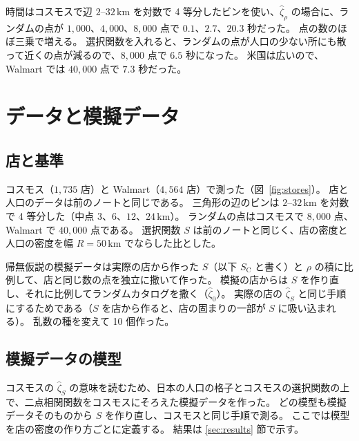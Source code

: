 \documentclass[a4paper,11pt]{ltjsarticle}
\begin{document}
時間はコスモスで辺 $2$--$32\,\mathrm{km}$ を対数で 4 等分したビンを使い、$\hat\zeta_\rho$ の場合に、ランダムの点が $1{,}000$、$4{,}000$、$8{,}000$ 点で $0.1$、$2.7$、$20.3$ 秒だった。
点の数のほぼ三乗で増える。
選択関数を入れると、ランダムの点が人口の少ない所にも散って近くの点が減るので、$8{,}000$ 点で $6.5$ 秒になった。
米国は広いので、Walmart では $40{,}000$ 点で $7.3$ 秒だった。

\section{データと模擬データ}
\label{sec:data}

\subsection{店と基準}
\label{sec:data-stores}

コスモス（$1{,}735$ 店）と Walmart（$4{,}564$ 店）で測った（図~\ref{fig:stores}）。
店と人口のデータは前のノートと同じである。
三角形の辺のビンは $2$--$32\,\mathrm{km}$ を対数で 4 等分した（中点 $3$、$6$、$12$、$24\,\mathrm{km}$）。
ランダムの点はコスモスで $8{,}000$ 点、Walmart で $40{,}000$ 点である。
選択関数 $S$ は前のノートと同じく、店の密度と人口の密度を幅 $R = 50\,\mathrm{km}$ でならした比とした。

帰無仮説の模擬データは実際の店から作った $S$（以下 $S_{\mathrm{C}}$ と書く）と $\rho$ の積に比例して、店と同じ数の点を独立に撒いて作った。
模擬の店からは $S$ を作り直し、それに比例してランダムカタログを撒く（$\hat\zeta_0$）。
実際の店の $\hat\zeta_S$ と同じ手順にするためである（$S$ を店から作ると、店の固まりの一部が $S$ に吸い込まれる）。
乱数の種を変えて 10 個作った。

\subsection{模擬データの模型}
\label{sec:mocks}
\label{sec:matched-mocks}

コスモスの $\hat\zeta_S$ の意味を読むため、日本の人口の格子とコスモスの選択関数の上で、二点相関関数をコスモスにそろえた模擬データを作った。
どの模型も模擬データそのものから $S$ を作り直し、コスモスと同じ手順で測る。
ここでは模型を店の密度の作り方ごとに定義する。
結果は \ref{sec:results} 節で示す。
\end{document}
